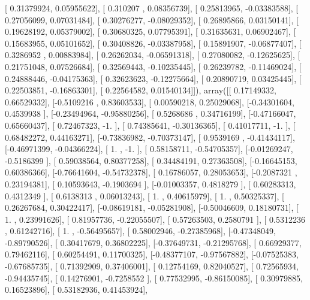 \documentclass{article}
\begin{document}
       [ 0.31379924,  0.05955622],
       [ 0.310207  ,  0.08356739],
       [ 0.25813965, -0.03383588],
       [ 0.27056099,  0.07031484],
       [ 0.30276277, -0.08029352],
       [ 0.26895866,  0.03150141],
       [ 0.19628192,  0.05379002],
       [ 0.30680325,  0.07795391],
       [ 0.31635631,  0.06902467],
       [ 0.15683955,  0.05101652],
       [ 0.30408826, -0.03387958],
       [ 0.15891907, -0.06877407],
       [ 0.3286952 ,  0.00883984],
       [ 0.26262034, -0.06591318],
       [ 0.27080082, -0.12625625],
       [ 0.21751048,  0.07526684],
       [ 0.32569443, -0.10235445],
       [ 0.26239782, -0.11469024],
       [ 0.24888446, -0.04175363],
       [ 0.32623623, -0.12275664],
       [ 0.20890719,  0.03425445],
       [ 0.22503851, -0.16863301],
       [ 0.22564582,  0.01540134]]), array([[ 0.17149332,  0.66529332],
       [-0.5109216 ,  0.83603533],
       [ 0.00590218,  0.25029068],
       [-0.34301604,  0.4539938 ],
       [-0.23494964, -0.95880256],
       [ 0.5268686 ,  0.34716199],
       [-0.47166047,  0.65660437],
       [ 0.72467323, -1.        ],
       [ 0.74385641, -0.30136365],
       [ 0.41017711, -1.        ],
       [ 0.68482272,  0.44163271],
       [-0.73836982, -0.70373147],
       [ 0.9539169 , -0.41434117],
       [-0.46971399, -0.04366224],
       [ 1.        , -1.        ],
       [ 0.58158711, -0.54705357],
       [-0.01269247, -0.5186399 ],
       [ 0.59038564,  0.80377258],
       [ 0.34484191,  0.27363508],
       [-0.16645153,  0.60386366],
       [-0.76641604, -0.54732378],
       [ 0.16786057,  0.28053653],
       [-0.2087321 ,  0.23194381],
       [ 0.10593643, -0.1903694 ],
       [-0.01003357,  0.4818279 ],
       [ 0.60283313,  0.4312349 ],
       [ 0.6138313 ,  0.06013243],
       [ 1.        ,  0.40615979],
       [ 1.        ,  0.50325337],
       [ 0.26267684,  0.30422417],
       [-0.08619181, -0.05281908],
       [-0.50046609,  0.18180731],
       [ 1.        ,  0.23991626],
       [ 0.81957736, -0.22055507],
       [ 0.57263503,  0.2580791 ],
       [ 0.5312236 ,  0.61242716],
       [ 1.        , -0.56495657],
       [ 0.58002946, -0.27385968],
       [-0.47348049, -0.89790526],
       [ 0.30417679,  0.36802225],
       [-0.37649731, -0.21295768],
       [ 0.66929377,  0.79462116],
       [ 0.60254491,  0.11700325],
       [-0.48377107, -0.97567882],
       [-0.07525383, -0.67685735],
       [ 0.71392909,  0.37406001],
       [ 0.12754169,  0.82040527],
       [ 0.72565934, -0.94435745],
       [ 0.14276901, -0.7258552 ],
       [ 0.77532995, -0.86150085],
       [ 0.30979885,  0.16523896],
       [ 0.53182936,  0.41453924],
\end{document}

